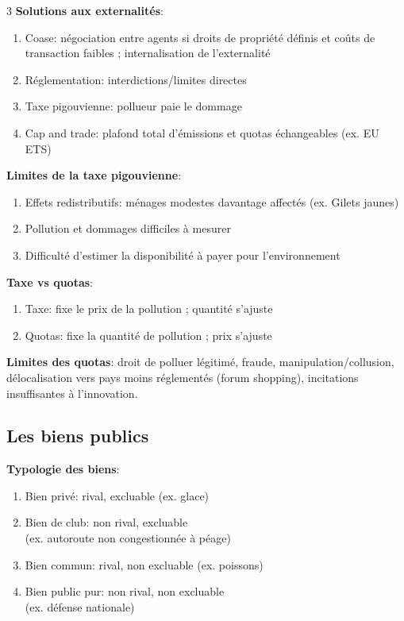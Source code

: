 \documentclass[12pt, a4paper]{article}
\begin{document}
\begin{multicols*}{3}
\textbf{Solutions aux externalités}:
\begin{enumerate}[\roman*.]
  \item Coase: négociation entre agents si droits de propriété définis et coûts de transaction faibles ; internalisation de l'externalité
  \item Réglementation: interdictions/limites directes
  \item Taxe pigouvienne: pollueur paie le dommage 
  \item Cap and trade: plafond total d'émissions et quotas échangeables (ex. EU ETS)
\end{enumerate}

\textbf{Limites de la taxe pigouvienne}:
\begin{enumerate}[\roman*.]
  \item Effets redistributifs: ménages modestes davantage affectés (ex. Gilets jaunes)
  \item Pollution et dommages difficiles à mesurer
  \item Difficulté d'estimer la disponibilité à payer pour l'environnement
\end{enumerate}

\textbf{Taxe vs quotas}:
\begin{enumerate}[\roman*.]
  \item Taxe: fixe le prix de la pollution ; quantité s'ajuste
  \item Quotas: fixe la quantité de pollution ; prix s'ajuste
\end{enumerate}

\textbf{Limites des quotas}: droit de polluer légitimé, fraude, manipulation/collusion, délocalisation vers pays moins réglementés (forum shopping), incitations insuffisantes à l'innovation.

\subsection{Les biens publics}

\textbf{Typologie des biens}:
\begin{enumerate}[\roman*.]
  \item Bien privé: rival, excluable (ex. glace)
  \item Bien de club: non rival, excluable\\(ex. autoroute non congestionnée à péage)
  \item Bien commun: rival, non excluable (ex. poissons)
  \item Bien public pur: non rival, non excluable\\(ex. défense nationale)
\end{enumerate}


\end{multicols*}
\end{document}
